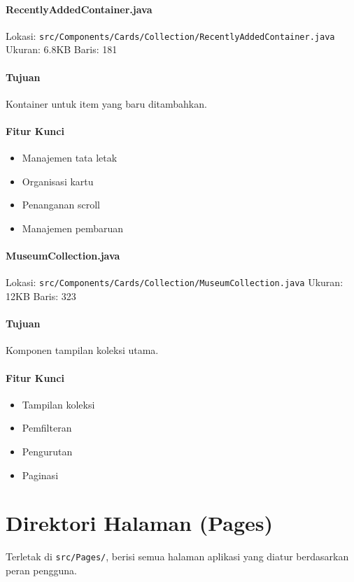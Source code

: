 \documentclass[12pt,a4paper]{article}
\begin{document}
\paragraph{RecentlyAddedContainer.java}
Lokasi: \texttt{src/Components/Cards/Collection/RecentlyAddedContainer.java}
Ukuran: 6.8KB
Baris: 181

\paragraph{Tujuan}
Kontainer untuk item yang baru ditambahkan.

\paragraph{Fitur Kunci}
\begin{itemize}
    \item Manajemen tata letak
    \item Organisasi kartu
    \item Penanganan scroll
    \item Manajemen pembaruan
\end{itemize}

\paragraph{MuseumCollection.java}
Lokasi: \texttt{src/Components/Cards/Collection/MuseumCollection.java}
Ukuran: 12KB
Baris: 323

\paragraph{Tujuan}
Komponen tampilan koleksi utama.

\paragraph{Fitur Kunci}
\begin{itemize}
    \item Tampilan koleksi
    \item Pemfilteran
    \item Pengurutan
    \item Paginasi
\end{itemize}

\section{Direktori Halaman (Pages)}
Terletak di \texttt{src/Pages/}, berisi semua halaman aplikasi yang diatur berdasarkan peran pengguna.
\end{document}
